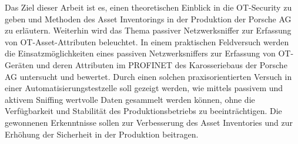 Das Ziel dieser Arbeit ist es, einen theoretischen Einblick in die OT-Security zu geben und Methoden des Asset Inventorings in der Produktion der Porsche AG zu erläutern. Weiterhin wird das Thema passiver Netzwerksniffer zur Erfassung von OT-Asset-Attributen beleuchtet. In einem praktischen Feldversuch werden die Einsatzmöglichkeiten eines passiven Netzwerksniffers zur Erfassung von OT-Geräten und deren Attributen im PROFINET des Karosseriebaus der Porsche AG untersucht und bewertet. Durch einen solchen praxisorientierten Versuch in einer Automatisierungstestzelle soll gezeigt werden, wie mittels passivem und aktivem Sniffing wertvolle Daten gesammelt werden können, ohne die Verfügbarkeit und Stabilität des Produktionsbetriebs zu beeinträchtigen. Die gewonnenen Erkenntnisse sollen zur Verbesserung des Asset Inventories und zur Erhöhung der Sicherheit in der Produktion beitragen.


